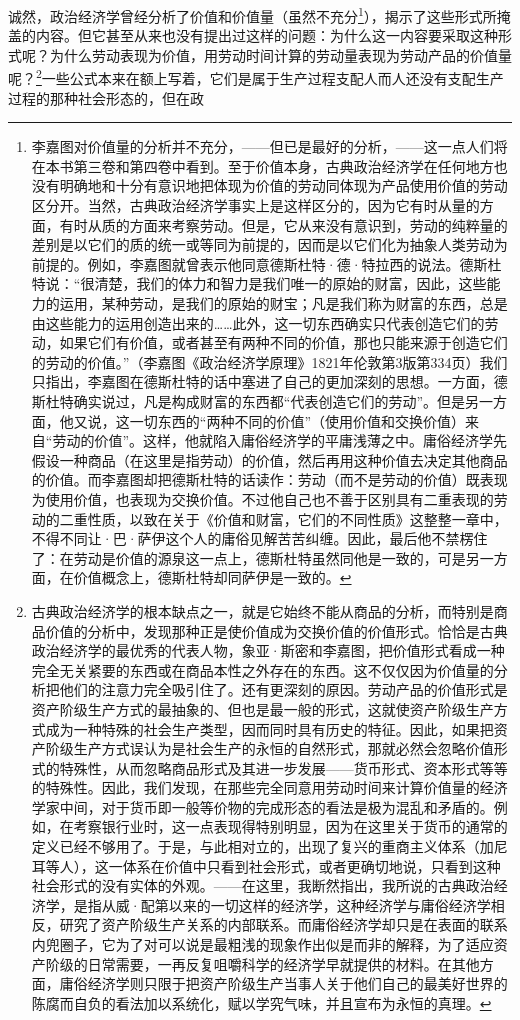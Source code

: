 \documentclass{ctexbook}
\begin{document}
    诚然，政治经济学曾经分析了价值和价值量（虽然不充分\footnote{李嘉图对价值量的分析并不充分，——但已是最好的分析，——这一点人们将在本书第三卷和第四卷中看到。至于价值本身，古典政治经济学在任何地方也没有明确地和十分有意识地把体现为价值的劳动同体现为产品使用价值的劳动区分开。当然，古典政治经济学事实上是这样区分的，因为它有时从量的方面，有时从质的方面来考察劳动。但是，它从来没有意识到，劳动的纯粹量的差别是以它们的质的统一或等同为前提的，因而是以它们化为抽象人类劳动为前提的。例如，李嘉图就曾表示他同意德斯杜特·德·特拉西的说法。德斯杜特说：“很清楚，我们的体力和智力是我们唯一的原始的财富，因此，这些能力的运用，某种劳动，是我们的原始的财宝；凡是我们称为财富的东西，总是由这些能力的运用创造出来的……此外，这一切东西确实只代表创造它们的劳动，如果它们有价值，或者甚至有两种不同的价值，那也只能来源于创造它们的劳动的价值。”（李嘉图《政治经济学原理》1821年伦敦第3版第334页）我们只指出，李嘉图在德斯杜特的话中塞进了自己的更加深刻的思想。一方面，德斯杜特确实说过，凡是构成财富的东西都“代表创造它们的劳动”。但是另一方面，他又说，这一切东西的“两种不同的价值”（使用价值和交换价值）来自“劳动的价值”。这样，他就陷入庸俗经济学的平庸浅薄之中。庸俗经济学先假设一种商品（在这里是指劳动）的价值，然后再用这种价值去决定其他商品的价值。而李嘉图却把德斯杜特的话读作：劳动（而不是劳动的价值）既表现为使用价值，也表现为交换价值。不过他自己也不善于区别具有二重表现的劳动的二重性质，以致在关于《价值和财富，它们的不同性质》这整整一章中，不得不同让·巴·萨伊这个人的庸俗见解苦苦纠缠。因此，最后他不禁楞住了：在劳动是价值的源泉这一点上，德斯杜特虽然同他是一致的，可是另一方面，在价值概念上，德斯杜特却同萨伊是一致的。}），揭示了这些形式所掩盖的内容。但它甚至从来也没有提出过这样的问题：为什么这一内容要采取这种形式呢？为什么劳动表现为价值，用劳动时间计算的劳动量表现为劳动产品的价值量呢？\footnote{古典政治经济学的根本缺点之一，就是它始终不能从商品的分析，而特别是商品价值的分析中，发现那种正是使价值成为交换价值的价值形式。恰恰是古典政治经济学的最优秀的代表人物，象亚·斯密和李嘉图，把价值形式看成一种完全无关紧要的东西或在商品本性之外存在的东西。这不仅仅因为价值量的分析把他们的注意力完全吸引住了。还有更深刻的原因。劳动产品的价值形式是资产阶级生产方式的最抽象的、但也是最一般的形式，这就使资产阶级生产方式成为一种特殊的社会生产类型，因而同时具有历史的特征。因此，如果把资产阶级生产方式误认为是社会生产的永恒的自然形式，那就必然会忽略价值形式的特殊性，从而忽略商品形式及其进一步发展——货币形式、资本形式等等的特殊性。因此，我们发现，在那些完全同意用劳动时间来计算价值量的经济学家中间，对于货币即一般等价物的完成形态的看法是极为混乱和矛盾的。例如，在考察银行业时，这一点表现得特别明显，因为在这里关于货币的通常的定义已经不够用了。于是，与此相对立的，出现了复兴的重商主义体系（加尼耳等人），这一体系在价值中只看到社会形式，或者更确切地说，只看到这种社会形式的没有实体的外观。——在这里，我断然指出，我所说的古典政治经济学，是指从威·配第以来的一切这样的经济学，这种经济学与庸俗经济学相反，研究了资产阶级生产关系的内部联系。而庸俗经济学却只是在表面的联系内兜圈子，它为了对可以说是最粗浅的现象作出似是而非的解释，为了适应资产阶级的日常需要，一再反复咀嚼科学的经济学早就提供的材料。在其他方面，庸俗经济学则只限于把资产阶级生产当事人关于他们自己的最美好世界的陈腐而自负的看法加以系统化，赋以学究气味，并且宣布为永恒的真理。}一些公式本来在额上写着，它们是属于生产过程支配人而人还没有支配生产过程的那种社会形态的，但在政
\end{document}
